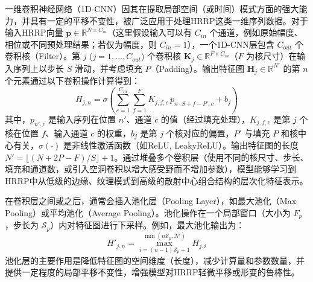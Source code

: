 一维卷积神经网络（1D-CNN）因其在提取局部空间（或时间）模式方面的强大能力，并具有一定的平移不变性，被广泛应用于处理HRRP这类一维序列数据。对于输入HRRP向量 $\mathbf{p} \in \mathbb{R}^{N \times C_{in}}$（这里假设输入可以有 $C_{in}$ 个通道，例如原始幅度、相位或不同预处理结果；若仅为幅度，则 $C_{in}=1$），一个1D-CNN层包含 $C_{out}$ 个卷积核（Filter）。第 $j$ ($j=1, \dots, C_{out}$) 个卷积核 $\mathbf{K}_j \in \mathbb{R}^{F \times C_{in}}$（$F$ 为核尺寸）在输入序列上以步长 $S$ 滑动，并考虑填充 $P$（Padding）。输出特征图 $\mathbf{H}_j \in \mathbb{R}^{N'}$ 的第 $n$ 个元素通过以下卷积操作计算得到：
\begin{equation}
    H_{j,n} = \sigma\left( \sum_{c=1}^{C_{in}} \sum_{f=1}^{F} K_{j,f,c} \, p_{n \cdot S + f - P', c} + b_j \right)
    \label{eq:1d_cnn_conv_detailed}
\end{equation}
其中，$p_{n',c}$ 是输入序列在位置 $n'$、通道 $c$ 的值（经过填充处理），$K_{j,f,c}$ 是第 $j$ 个核在位置 $f$、输入通道 $c$ 的权重，$b_j$ 是第 $j$ 个核对应的偏置，$P'$ 与填充 $P$ 和核中心有关，$\sigma(\cdot)$ 是非线性激活函数（如ReLU, LeakyReLU）。输出特征图的长度 $N' = \lfloor (N + 2P - F) / S \rfloor + 1$。通过堆叠多个卷积层（使用不同的核尺寸、步长、填充和通道数，或引入空洞卷积以增大感受野而不增加参数），模型能够学习到HRRP中从低级的边缘、纹理模式到高级的散射中心组合结构的层次化特征表示。

在卷积层之间或之后，通常会插入池化层（Pooling Layer），如最大池化（Max Pooling）或平均池化（Average Pooling）。池化操作在一个局部窗口（大小为 $F_p$，步长为 $\mathcal{S}_p$）内对特征图进行下采样。例如，最大池化输出为：
\begin{equation}
    H'_{j,n} = \max_{i=(n-1)\mathcal{S}_p+1}^{\min(n\mathcal{S}_p, N')} H_{j,i}
    \label{eq:max_pooling}
\end{equation}
池化层的主要作用是降低特征图的空间维度（长度），减少计算量和参数数量，并提供一定程度的局部平移不变性，增强模型对HRRP轻微平移或形变的鲁棒性。

